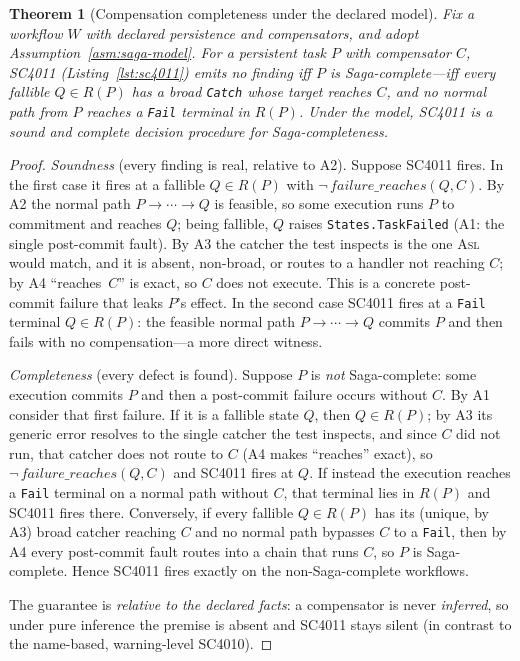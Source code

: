\documentclass[11pt]{article}
\newcommand{\code}[1]{\textsf{\small #1}}
\newcommand{\asl}{\textsc{Asl}}
\theoremstyle{plain}
\newtheorem{theorem}{Theorem}
\theoremstyle{definition}
\theoremstyle{remark}
\begin{document}
\begin{theorem}[Compensation completeness under the declared model]\label{thm:saga}
Fix a workflow $W$ with \emph{declared} persistence and compensators, and adopt
Assumption~\ref{asm:saga-model}. For a persistent task $P$ with compensator $C$, \code{SC4011}
(Listing~\ref{lst:sc4011}) emits no finding \emph{iff} $P$ is Saga-complete---iff every fallible
$Q\in R(P)$ has a broad \texttt{Catch} whose target reaches $C$, and no normal path from $P$
reaches a \texttt{Fail} terminal in $R(P)$. Under the model, \code{SC4011} is a \emph{sound and
complete} decision procedure for Saga-completeness.
\end{theorem}
\begin{proof}
\emph{Soundness} (every finding is real, relative to A2). Suppose \code{SC4011} fires. In the
first case it fires at a fallible $Q\in R(P)$ with $\neg\,\mathit{failure\_reaches}(Q,C)$. By A2
the normal path $P\to\cdots\to Q$ is feasible, so some execution runs $P$ to commitment and
reaches $Q$; being fallible, $Q$ raises \texttt{States.TaskFailed} (A1: the single post-commit
fault). By A3 the catcher the test inspects is the one \asl{} would match, and it is absent,
non-broad, or routes to a handler not reaching $C$; by A4 ``reaches~$C$'' is exact, so $C$ does
not execute. This is a concrete post-commit failure that leaks $P$'s effect. In the second case
\code{SC4011} fires at a \texttt{Fail} terminal $Q\in R(P)$: the feasible normal path
$P\to\cdots\to Q$ commits $P$ and then fails with no compensation---a more direct witness.

\emph{Completeness} (every defect is found). Suppose $P$ is \emph{not} Saga-complete: some
execution commits $P$ and then a post-commit failure occurs without $C$. By A1 consider that
first failure. If it is a fallible state $Q$, then $Q\in R(P)$; by A3 its generic error resolves
to the single catcher the test inspects, and since $C$ did not run, that catcher does not route
to $C$ (A4 makes ``reaches'' exact), so $\neg\,\mathit{failure\_reaches}(Q,C)$ and \code{SC4011}
fires at $Q$. If instead the execution reaches a \texttt{Fail} terminal on a normal path without
$C$, that terminal lies in $R(P)$ and \code{SC4011} fires there. Conversely, if every fallible
$Q\in R(P)$ has its (unique, by A3) broad catcher reaching $C$ and no normal path bypasses $C$ to
a \texttt{Fail}, then by A4 every post-commit fault routes into a chain that runs $C$, so $P$ is
Saga-complete. Hence \code{SC4011} fires exactly on the non-Saga-complete workflows.

The guarantee is \emph{relative to the declared facts}: a compensator is never \emph{inferred},
so under pure inference the premise is absent and \code{SC4011} stays silent (in contrast to the
name-based, warning-level \code{SC4010}).
\end{proof}
\end{document}
